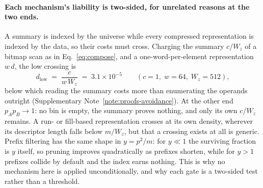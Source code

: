 \paragraph*{Each mechanism's liability is two-sided, for unrelated reasons at the two ends.}
A summary is indexed by the universe while every compressed representation is indexed by the data, so
their costs must cross. Charging the summary $c/W_z$ of a bitmap scan as in Eq.~\eqref{eq:compose},
and a one-word-per-element representation $w\,d$, the low crossing is
\begin{equation}
d_{\mathrm{low}} \;=\; \frac{c}{w\,W_z} \;=\; 3.1\times10^{-5} \qquad (c=1,\; w=64,\; W_z=512),
\label{eq:dlow}
\end{equation}
below which reading the summary costs more than enumerating the operands outright (Supplementary Note~\ref{note:proofs-avoidance}). At the other end $p_Ap_B\to1$: no bin is empty, the summary proves nothing, and only its own
$c/W_z$ remains. A run- or fill-based representation crosses at its own density, wherever its
descriptor length falls below $m/W_z$, but that a crossing exists at all is generic. Prefix filtering
has the same shape in $y=p^2/m$: for $y\ll1$ the surviving fraction is $y$ itself, so pruning improves
quadratically as prefixes shorten, while for $y>1$ prefixes collide by default and the index earns
nothing. This is why no mechanism here is applied unconditionally, and why each gate is a two-sided
test rather than a threshold.

